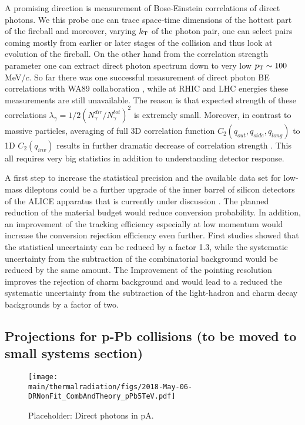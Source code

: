 \documentclass[../report.tex]{subfiles}
\providecommand{\main}{..}
\begin{document}
A promising direction is measurement of Bose-Einstein correlations of direct photons. We this probe one can trace space-time dimensions of the hottest part of the fireball and moreover, varying $k_{\rm T}$ of the photon pair, one can select pairs coming mostly from earlier or later stages of the collision and thus look at evolution of the fireball. On the other hand from the correlation strength parameter one can extract direct photon spectrum down to very low $p_{\rm T} \sim 100$ MeV/$c$. So far there was one successful measurement of direct photon BE correlations with WA89 collaboration \cite{Aggarwal:2003zy}, while at RHIC and LHC energies these measurements are still unavailable. The reason is that expected strength of these correlations $\lambda_\gamma = 1/2(N_\gamma^{dir}/N_{\gamma}^{tot})^2$ is extremely small. Moreover, in contrast to massive particles, averaging of full 3D correlation function $C_2(q_{out},q_{side},q_{long})$ to 1D $C_2(q_{inv})$ results in further dramatic decrease of correlation strength \cite{Aggarwal:2003zy}. This all requires very big statistics in addition to understanding detector response. 


A first step to increase the statistical precision and the available data set for low-mass dileptons could be a further upgrade of the inner barrel of silicon detectors of the ALICE apparatus that is currently under discussion \cite{ALICE_ITS_EoI}. The planned reduction of the material budget would reduce conversion probability. In addition, an improvement of the tracking efficiency especially at low momentum would increase the conversion rejection efficiency even further. First studies \cite{ALICE_ITS_EoI} showed that the statistical uncertainty can be reduced by a factor 1.3, while the systematic uncertainty from the subtraction of the combinatorial background would be reduced by the same amount. The Improvement of the pointing resolution improves the rejection of charm background and would lead to a reduced the systematic uncertainty from the subtraction of the light-hadron and charm decay backgrounds by a factor of two. 

\subsection{Projections for p-Pb collisions (to be moved to small systems section)}

\begin{figure}[htb]
\centering
\texttt{[image: \\main/thermalradiation/figs/2018-May-06-DRNonFit\_CombAndTheory\_pPb5TeV.pdf]}
\caption{Placeholder: Direct photons in pA. }
\label{fig:RealPhotonsRgpA}
\end{figure}
\end{document}
